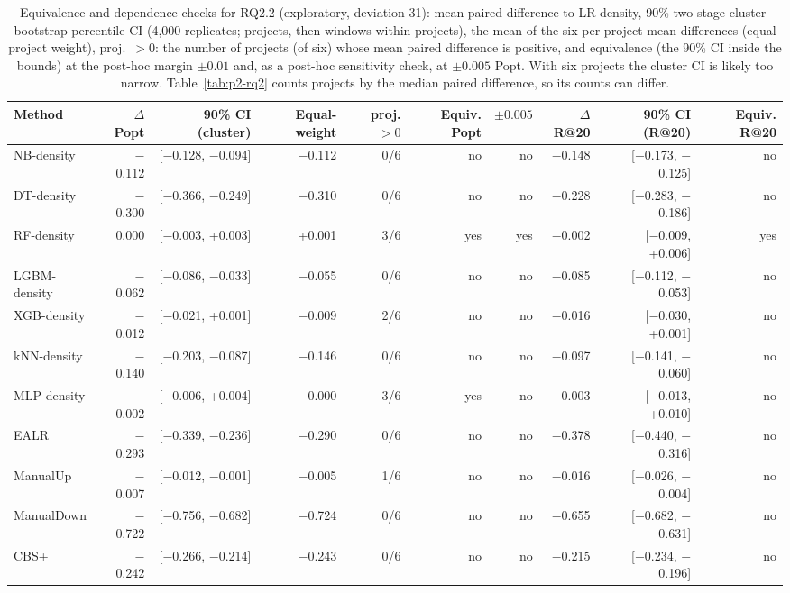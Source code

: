\begin{table}[t]
\centering
\footnotesize
\caption{Equivalence and dependence checks for RQ2.2 (exploratory, deviation 31): mean paired difference to LR-density, 90\% two-stage cluster-bootstrap percentile CI (4{,}000 replicates; projects, then windows within projects), the mean of the six per-project mean differences (equal project weight), proj.\ $>0$: the number of projects (of six) whose mean paired difference is positive, and equivalence (the 90\% CI inside the bounds) at the post-hoc margin $\pm0.01$ and, as a post-hoc sensitivity check, at $\pm0.005$ Popt. With six projects the cluster CI is likely too narrow. Table~\ref{tab:p2-rq2} counts projects by the median paired difference, so its counts can differ.}
\label{tab:p2-equiv}
\begin{adjustbox}{max width=\linewidth}
\begin{tabular}{lrrrrrrrrr}
\toprule
Method & $\Delta$Popt & 90\% CI (cluster) & Equal-weight & proj. $>0$ & Equiv. Popt & $\pm0.005$ & $\Delta$R@20 & 90\% CI (R@20) & Equiv. R@20 \\
\midrule
NB-density & $-$0.112 & [$-$0.128, $-$0.094] & $-$0.112 & 0/6 & no & no & $-$0.148 & [$-$0.173, $-$0.125] & no \\
DT-density & $-$0.300 & [$-$0.366, $-$0.249] & $-$0.310 & 0/6 & no & no & $-$0.228 & [$-$0.283, $-$0.186] & no \\
RF-density & 0.000 & [$-$0.003, +0.003] & +0.001 & 3/6 & yes & yes & $-$0.002 & [$-$0.009, +0.006] & yes \\
LGBM-density & $-$0.062 & [$-$0.086, $-$0.033] & $-$0.055 & 0/6 & no & no & $-$0.085 & [$-$0.112, $-$0.053] & no \\
XGB-density & $-$0.012 & [$-$0.021, +0.001] & $-$0.009 & 2/6 & no & no & $-$0.016 & [$-$0.030, +0.001] & no \\
kNN-density & $-$0.140 & [$-$0.203, $-$0.087] & $-$0.146 & 0/6 & no & no & $-$0.097 & [$-$0.141, $-$0.060] & no \\
MLP-density & $-$0.002 & [$-$0.006, +0.004] & 0.000 & 3/6 & yes & no & $-$0.003 & [$-$0.013, +0.010] & no \\
EALR & $-$0.293 & [$-$0.339, $-$0.236] & $-$0.290 & 0/6 & no & no & $-$0.378 & [$-$0.440, $-$0.316] & no \\
ManualUp & $-$0.007 & [$-$0.012, $-$0.001] & $-$0.005 & 1/6 & no & no & $-$0.016 & [$-$0.026, $-$0.004] & no \\
ManualDown & $-$0.722 & [$-$0.756, $-$0.682] & $-$0.724 & 0/6 & no & no & $-$0.655 & [$-$0.682, $-$0.631] & no \\
CBS+ & $-$0.242 & [$-$0.266, $-$0.214] & $-$0.243 & 0/6 & no & no & $-$0.215 & [$-$0.234, $-$0.196] & no \\
\bottomrule
\end{tabular}
\end{adjustbox}
\end{table}

